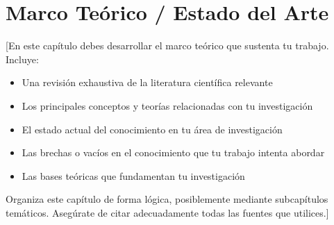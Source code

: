 \chapter{Marco Teórico / Estado del Arte}

[En este capítulo debes desarrollar el marco teórico que sustenta tu trabajo. Incluye:

\begin{itemize}
    \item Una revisión exhaustiva de la literatura científica relevante
    \item Los principales conceptos y teorías relacionadas con tu investigación
    \item El estado actual del conocimiento en tu área de investigación
    \item Las brechas o vacíos en el conocimiento que tu trabajo intenta abordar
    \item Las bases teóricas que fundamentan tu investigación
\end{itemize}

Organiza este capítulo de forma lógica, posiblemente mediante subcapítulos temáticos.
Asegúrate de citar adecuadamente todas las fuentes que utilices.]
